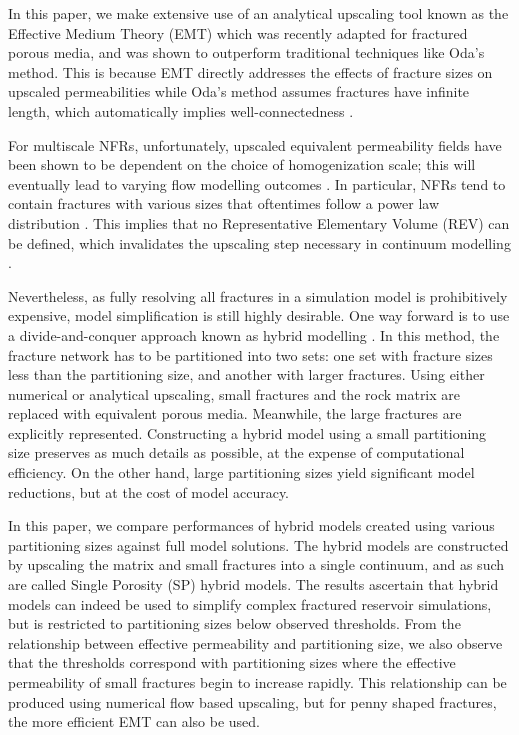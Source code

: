 \documentclass[draft]{agujournal2018}
\begin{document}
In this paper, we make extensive use of an analytical upscaling tool known as the Effective Medium Theory (EMT) which was recently adapted for fractured porous media, and was shown to outperform traditional techniques like Oda's method. This is because EMT directly addresses the effects of fracture sizes on upscaled permeabilities while Oda's method assumes fractures have infinite length, which automatically implies well-connectedness \citep{Oda1985, Saevik2013, Saevik2014}.

For multiscale NFRs, unfortunately, upscaled equivalent permeability fields have been shown to be dependent on the choice of homogenization scale; this will eventually lead to varying flow modelling outcomes \citep{Elfeel2013}. In particular, NFRs tend to contain fractures with various sizes that oftentimes follow a power law distribution \citep{Bonnet2001}. This implies that no Representative Elementary Volume (REV) can be defined, which invalidates the upscaling step necessary in continuum modelling \citep{Berkowitz2002}.

Nevertheless, as fully resolving all fractures in a simulation model is prohibitively expensive, model simplification is still highly desirable. One way forward is to use a divide-and-conquer approach known as hybrid modelling \citep{Berkowitz2002, Bourbiaux2010}. In this method, the fracture network has to be partitioned into two sets: one set with fracture sizes less than the partitioning size, and another with larger fractures. Using either numerical or analytical upscaling, small fractures and the rock matrix are replaced with equivalent porous media. Meanwhile, the large fractures are explicitly represented. Constructing a hybrid model using a small partitioning size preserves as much details as possible, at the expense of computational efficiency. On the other hand, large partitioning sizes yield significant model reductions, but at the cost of model accuracy.

In this paper, we compare performances of hybrid models created using various partitioning sizes against full model solutions. The hybrid models are constructed by upscaling the matrix and small fractures into a single continuum, and as such are called Single Porosity (SP) hybrid models. The results ascertain that hybrid models can indeed be used to simplify complex fractured reservoir simulations, but is restricted to partitioning sizes below observed thresholds. From the relationship between effective permeability and partitioning size, we also observe that the thresholds correspond with partitioning sizes where the effective permeability of small fractures begin to increase rapidly. This relationship can be produced using numerical flow based upscaling, but for penny shaped fractures, the more efficient EMT can also be used.
\end{document}
